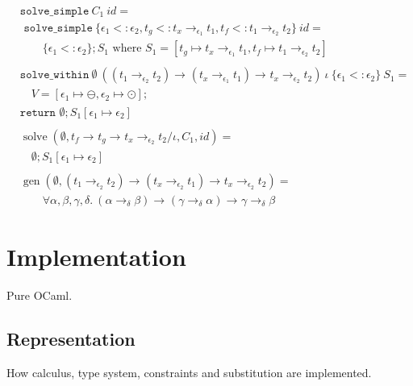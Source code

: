\documentclass[declaration,shortabstract]{iithesis}
\theoremstyle{definition} \newtheorem{definition}{Definition}[section]
\newcommand{\arrow}[3]{{#1}\rightarrow_{#2}{#3}}
\begin{document}
\begin{align*}
  & \texttt{solve\_simple}\  C_1\ id = \\
  & \texttt{  solve\_simple}\ \{
            \epsilon_1 <: \epsilon_2,
           t_g <: \arrow{t_x}{\epsilon_1}{t_1}, 
           t_f <: \arrow{t_1}{\epsilon_2}{t_2}
        \}\ id = \\
  & \qquad \{\epsilon_1 <: \epsilon_2\} ; S_1 \text{ where }  S_1 = [t_g \mapsto \arrow{t_x}{\epsilon_1}{t_1}, t_f \mapsto \arrow{t_1}{\epsilon_2}{t_2}]
\\ \\
  & \texttt{solve\_within}\ \emptyset\
    (\arrow{(\arrow{t_1}{\epsilon_2}{t_2})}{}{\arrow{(\arrow{t_x}{\epsilon_1}{t_1})}{}{\arrow{t_x}{\epsilon_2}{t_2}}})
    \ \iota \ \{\epsilon_1 <: \epsilon_2\} \ S_1 = \\
  & \quad V = [\epsilon_1 \mapsto \ominus, \epsilon_2 \mapsto \odot] ;\\
  & \texttt{return } \emptyset ; S_1[\epsilon_1 \mapsto \epsilon_2]
\\ \\
& \operatorname{solve}(\emptyset, {\arrow{t_f}{}{\arrow{t_g}{}{\arrow{t_x}{\epsilon_2}{t_2}}}}/{\iota}, C_1, id) = 
\\ & \quad \emptyset ; S_1[\epsilon_1 \mapsto \epsilon_2]
\\ \\
& \operatorname{gen}(\emptyset, \arrow{(\arrow{t_1}{\epsilon_2}{t_2})}{}{\arrow{(\arrow{t_x}{\epsilon_2}{t_1})}{}{\arrow{t_x}{\epsilon_2}{t_2}}}) = \\
& \qquad \forall \alpha, \beta, \gamma, \delta .\ 
\arrow{(\arrow{\alpha}{\delta}{\beta})}{}{\arrow{(\arrow{\gamma}{\delta}{\alpha})}{}{\arrow{\gamma}{\delta}{\beta}}}
\end{align*}

\chapter{Implementation}
Pure OCaml.

\section{Representation}
How calculus, type system, constraints and substitution are implemented.

\end{document}
